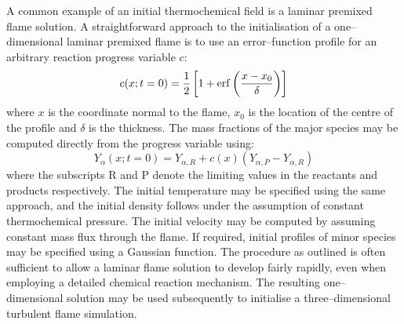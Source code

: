 \documentclass[dvips]{article}
\begin{document}
A common example of an initial thermochemical field is a laminar premixed
flame solution.  A straightforward approach to the initialisation of a
one--dimensional laminar premixed flame is to use an error--function profile
for an arbitrary reaction progress variable $c$:
\begin{equation}
c(x;t=0)=\frac{1}{2}\left[1+{\rm erf}\left(\frac{x-x_{0}}{\delta}\right)\right]
\end{equation}
where $x$ is the coordinate normal to the flame, $x_{0}$ is the location of
the centre of the profile and $\delta$ is the
thickness.  The mass fractions of the major species may be computed directly
from the progress variable using:
\begin{equation}
Y_{\alpha}(x;t=0)= Y_{\alpha,R}+c(x)\left(Y_{\alpha,P}-Y_{\alpha,R}\right)
\end{equation}
where the subscripts R and P denote the limiting values in the reactants and
products respectively.  The initial temperature may be specified using
the same approach, and the initial density follows under the assumption
of constant thermochemical pressure.  The initial velocity may be computed by
assuming
constant mass flux through the flame.  If required, initial profiles of minor
species may be specified using a Gaussian function.  The procedure as
outlined is often sufficient to allow a laminar flame solution
to develop fairly rapidly, even when employing a detailed chemical reaction
mechanism.  The resulting one--dimensional solution may be used subsequently to
initialise a three--dimensional turbulent flame simulation.

\newpage
\end{document}
